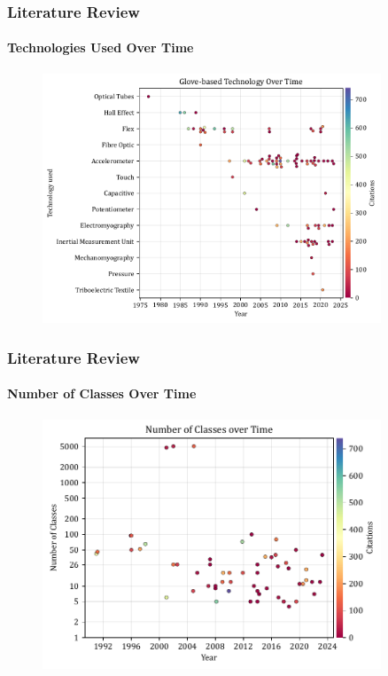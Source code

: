 \documentclass[xcolor={svgnames,table},10pt,fleqn]{beamer}
\begin{document}
\begin{frame}
    \frametitle{Literature Review}
    \framesubtitle{Technologies Used Over Time}
    \begin{figure}
        \includegraphics[width=0.9\textwidth]{imgs/03_tech_for_gloves.pdf}
    \end{figure}
\end{frame}

\begin{frame}
    \frametitle{Literature Review}
    \framesubtitle{Number of Classes Over Time}
    \begin{figure}
        \includegraphics[width=0.9\textwidth]{imgs/03_date_vs_nclasses.pdf}
    \end{figure}
\end{frame}
\end{document}
